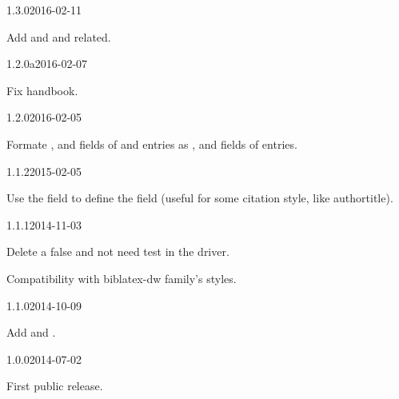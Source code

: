 \documentclass{ltxdockit}[2011/03/25]
\begin{document}
\begin{changelog}
\begin{release}{1.3.0}{2016-02-11}
\item Add  and  and related.
\end{release}

\begin{release}{1.2.0a}{2016-02-07}
\item Fix handbook.
\end{release}

\begin{release}{1.2.0}{2016-02-05}
\item Formate   ,  and  fields of   and  entries as ,  and  fields of  entries.
\end{release}

\begin{release}{1.1.2}{2015-02-05}
\item Use the  field to define the  field (useful for some citation style, like authortitle).
\end{release}

\begin{release}{1.1.1}{2014-11-03}
\item Delete a false and not need test in the driver.
\item Compatibility with biblatex-dw family's styles.
\end{release}
\begin{release}{1.1.0}{2014-10-09}
\item Add  and .
\end{release}

\begin{release}{1.0.0}{2014-07-02}
\item First public release.
\end{release}
\end{changelog}
\end{document}
